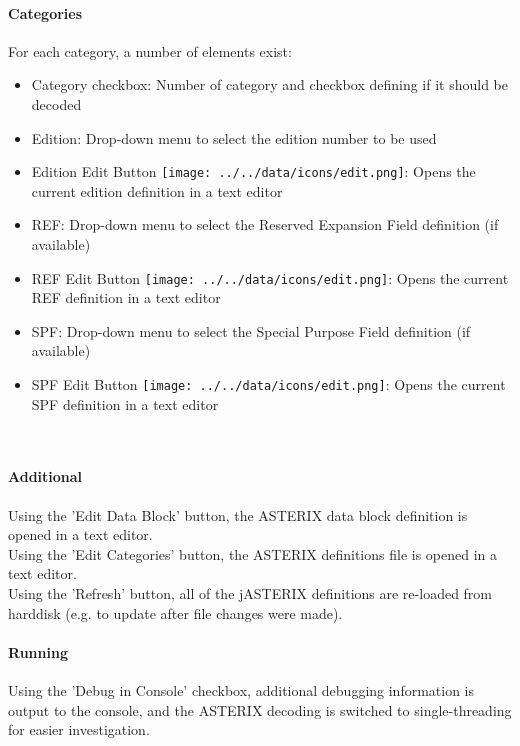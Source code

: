 \paragraph{Categories}

For each category, a number of elements exist:

\begin{itemize}
\item Category checkbox: Number of category and checkbox defining if it should be decoded
\item Edition: Drop-down menu to select the edition number to be used
\item Edition Edit Button \texttt{[image: ../../data/icons/edit.png]}: Opens the current edition definition in a text editor
\item REF: Drop-down menu to select the Reserved Expansion Field definition (if available)
\item REF Edit Button \texttt{[image: ../../data/icons/edit.png]}: Opens the current REF definition in a text editor
\item SPF: Drop-down menu to select the Special Purpose Field definition (if available)
\item SPF Edit Button \texttt{[image: ../../data/icons/edit.png]}: Opens the current SPF definition in a text editor
\end{itemize}
\ \\

\paragraph{Additional}

Using the 'Edit Data Block' button, the ASTERIX data block definition is opened in a text editor. \\

Using the 'Edit Categories' button, the ASTERIX definitions file is opened in a text editor. \\

Using the 'Refresh' button, all of the jASTERIX definitions are re-loaded from harddisk (e.g. to update after file changes were made). \\



\paragraph{Running}
Using the 'Debug in Console' checkbox, additional debugging information is output to the console, and the ASTERIX decoding is switched to single-threading for easier investigation. \\

